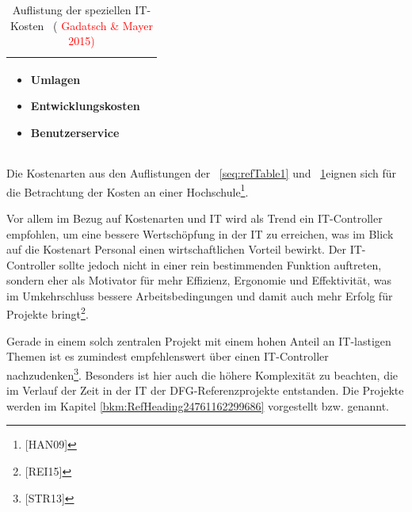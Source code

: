 \documentclass[a4paper]{article}
\newcommand\liststyleLSxv{%
\renewcommand\labelitemi{${\bullet}$}
\renewcommand\labelitemii{${\circ}$}
\renewcommand\labelitemiii{${\blacksquare}$}
\renewcommand\labelitemiv{${\bullet}$}
}
\begin{document}
\begin{table}
\begin{tabular}{|m{7.545cm}|m{6.228cm}|}
\liststyleLSxv
\begin{itemize}
\item {\sffamily\color{black} Umlagen}
\item {\sffamily\color{black} Entwicklungskosten}
\item {\sffamily\color{black} Benutzerservice}
\end{itemize}
\\\hline\end{tabular}
\caption[Auflistung der speziellen IT{}-Kosten \ ( Gadatsch \& Mayer 2015)]{Auflistung der speziellen IT-Kosten
\textcolor[rgb]{1.0,0.2,0.2}{\ ( }\textcolor{red}{Gadatsch \& Mayer 2015)}}
\label{seq:refTable2}
\end{table}

\bigskip

{\sffamily
Die Kostenarten aus den Auflistungen der \tablename~\ref{seq:refTable1} und \tablename~\ref{seq:refTable2}eignen sich
für die Betrachtung der Kosten an einer Hochschule\footnote{[HAN09]}. }


\bigskip


\bigskip



\bigskip

{\sffamily
Vor allem im Bezug auf Kostenarten und IT wird als Trend ein IT-Controller empfohlen, um eine bessere Wertschöpfung in
der IT zu erreichen, was im Blick auf die Kostenart Personal einen wirtschaftlichen Vorteil bewirkt. Der IT-Controller
sollte jedoch nicht in einer rein bestimmenden Funktion auftreten, sondern eher als Motivator für mehr Effizienz,
Ergonomie und Effektivität, was im Umkehrschluss bessere Arbeitsbedingungen und damit auch mehr Erfolg für Projekte
bringt\footnote{[REI15]}.}


\bigskip

{\sffamily
Gerade in einem solch zentralen Projekt mit einem hohen Anteil an IT-lastigen Themen ist es zumindest empfehlenswert
über einen IT-Controller nachzudenken\footnote{[STR13]}. Besonders ist hier auch die höhere Komplexität zu beachten,
die im Verlauf der Zeit in der IT der DFG-Referenzprojekte entstanden. Die Projekte werden im Kapitel
\ref{bkm:RefHeading24761162299686} vorgestellt bzw. genannt.}
\end{document}
